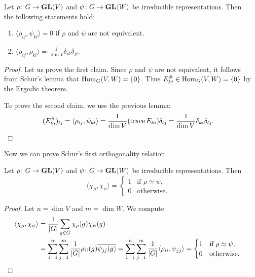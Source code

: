 \begin{theorem}[Schur]
    Let $\rho\colon G\to\mathbf{GL}(V)$ and $\psi\colon G\to\mathbf{GL}(W)$ be irreducible representations. 
    Then the following statements hold:
    \begin{enumerate}
        \item $\langle\rho_{ij},\psi_{kl}\rangle=0$ if $\rho$ and $\psi$ are not equivalent.
        \item $\displaystyle{\langle\rho_{ij},\rho_{kl}\rangle=\frac{1}{\dim V}\delta_{ik}\delta_{jl}}$.
    \end{enumerate}
\end{theorem}

\begin{proof}
    Let us prove the first claim. Since 
    $\rho$ and $\psi$ 
    are not equivalent, it follows from Schur's lemma that $\operatorname{Hom}_G(V,W)=\{0\}$.
    Thus $E_{ki}^\#\in\operatorname{Hom}_G(V,W)=\{0\}$ by the Ergodic theorem. 
    
    To prove the second claim, we use the previous lemma:
    \[
    (E_{ki}^\#)_{lj}=\langle\rho_{ij},\psi_{kl}\rangle
    =\frac{1}{\dim V}(\operatorname{trace} E_{ki})\delta_{lj}
    =\frac{1}{\dim V}\delta_{ki}\delta_{lj}.\qedhere
    \]
\end{proof}

Now we can prove Schur's first orthogonality relation.

\begin{theorem}[Schur]
Let $\rho\colon G\to\mathbf{GL}(V)$ and $\psi\colon G\to\mathbf{GL}(W)$ be irreducible representations. Then
\[
\langle\chi_\rho,\chi_\psi\rangle=
\begin{cases}
1 & \text{if $\rho\simeq\psi$,}\\
0 & \text{otherwise.}
\end{cases}
\]
\end{theorem}

\begin{proof}
    Let $n=\dim V$ and $m=\dim W$. We compute
    \begin{align*}
        \langle\chi_\rho,\chi_\psi\rangle
        &=\frac{1}{|G|}\sum_{g\in G}\chi_\rho(g)\overline{\chi_\psi}(g)\\
        &=\sum_{1=1}^n\sum_{j=1}^m\frac{1}{|G|}\rho_{ii}(g)\overline{\psi_{jj}(g)}
        =\sum_{1=1}^n\sum_{j=1}^m\frac{1}{|G|}\langle \rho_{ii},\psi_{jj}\rangle
        =\begin{cases}
            1 & \text{if $\rho\simeq\psi$,}\\
            0 & \text{otherwise.}
        \end{cases}\qedhere
    \end{align*}
\end{proof}

